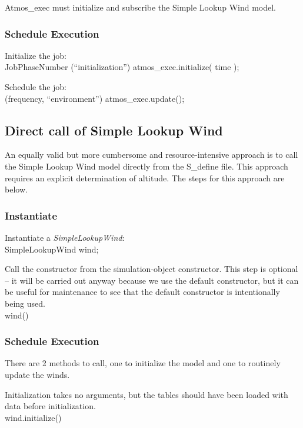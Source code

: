 \documentclass[11pt,fleqn]{report}
\begin{document}
Atmos\_exec must initialize and subscribe the Simple Lookup Wind model.

\subsubsection{Schedule Execution}
Initialize the job:\\
\indent\hspace{1cm} \colorbox{customorange}{JobPhaseNumber (\textquotedblleft initialization\textquotedblright)   atmos\_exec.initialize( time );}

Schedule the job:\\
\indent\hspace{1cm} \colorbox{customorange}{(frequency, \textquotedblleft environment\textquotedblright) atmos\_exec.update();}



\subsection{Direct call of Simple Lookup Wind}
An equally valid but more cumbersome and resource-intensive approach is to call the Simple Lookup Wind model directly from the S\_define file.  This approach requires an explicit determination of altitude.  The steps for this approach are below.
\subsubsection{Instantiate}
Instantiate a \textit{SimpleLookupWind}:\\
\indent\hspace{1cm} \colorbox{customorange}{SimpleLookupWind   wind;}

Call the constructor from the simulation-object constructor.  This step is optional – it will be carried out anyway because we use the default constructor, but it can be useful for maintenance to see that the default constructor is intentionally being used.\\
\indent\hspace{1cm} \colorbox{customorange}{wind()}

\subsubsection{Schedule Execution}
There are 2 methods to call, one to initialize the model and one to routinely update the winds.

Initialization takes no arguments, but the tables should have been loaded with data before initialization.\\
\indent\hspace{1cm} \colorbox{customorange}{wind.initialize()}
\end{document}

